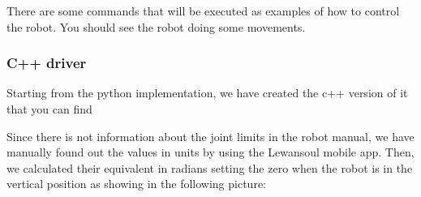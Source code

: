 \documentclass[letterpaper,10pt,english]{sphinxmanual}
\begin{document}
\sphinxAtStartPar
There are some commands that will be executed as examples of how to control the robot. You should see the robot doing some movements.


\subsubsection{C++ driver}
\label{\detokenize{user_guide/1_2_software_description:c-driver}}
\sphinxAtStartPar
Starting from the python implementation, we have created the c++ version of it that you can find 

\sphinxAtStartPar
Since there is not information about the joint limits in the robot manual, we have manually found out the values in units by using the Lewansoul mobile app. Then, we calculated their equivalent in radians setting the zero when the robot is in the vertical position as showing in the following picture:

\begin{figure}[htbp]
\centering

\noindent{}
\end{figure}
\end{document}
